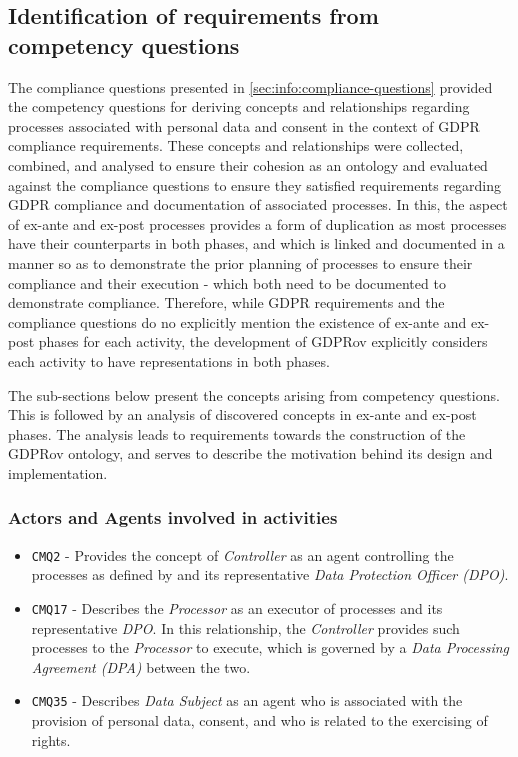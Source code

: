 \subsection{Identification of requirements from competency questions}\label{sec:gdprov:cq}
The compliance questions presented in \autoref{sec:info:compliance-questions} provided the competency questions for deriving concepts and relationships regarding processes associated with personal data and consent in the context of GDPR compliance requirements. 
These concepts and relationships were collected, combined, and analysed to ensure their cohesion as an ontology and evaluated against the compliance questions to ensure they satisfied requirements regarding GDPR compliance and documentation of associated processes.
In this, the aspect of ex-ante and ex-post processes provides a form of duplication as most processes have their counterparts in both phases, and which is linked and documented in a manner so as to demonstrate the prior planning of processes to ensure their compliance and their execution - which both need to be documented to demonstrate compliance.
Therefore, while GDPR requirements and the compliance questions do no explicitly mention the existence of ex-ante and ex-post phases for each activity, the development of GDPRov explicitly considers each activity to have representations in both phases.

The sub-sections below present the concepts arising from competency questions. 
This is followed by an analysis of discovered concepts in ex-ante and ex-post phases.
The analysis leads to requirements towards the construction of the GDPRov ontology, and serves to describe the motivation behind its design and implementation.

\subsubsection{Actors and Agents involved in activities}
\begin{itemize} 
    \item \texttt{CMQ2} - Provides the concept of \textit{Controller} as an agent controlling the processes as defined by and its representative \textit{Data Protection Officer (DPO)}.
    \item \texttt{CMQ17} - Describes the \textit{Processor} as an executor of processes and its representative \textit{DPO}. In this relationship, the \textit{Controller} provides such processes to the \textit{Processor} to execute, which is governed by a \textit{Data Processing Agreement (DPA)} between the two.
    \item \texttt{CMQ35} - Describes \textit{Data Subject} as an agent who is associated with the provision of personal data, consent, and who is related to the exercising of rights.
\end{itemize}

